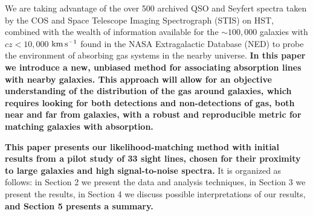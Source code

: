 \documentclass[twocolumn,tighten]{aastex6}
\begin{document}
We are taking advantage of the over 500 archived QSO and Seyfert spectra taken by the COS and Space Telescope Imaging Spectrograph (STIS) on HST, combined with the wealth of information available for the $\sim100,000$ galaxies with $cz<10,000$ $\rm km\, s^{-1}$ found in the NASA Extragalactic Database (NED) to probe the environment of absorbing gas systems in the nearby universe. \textbf{In this paper we introduce a new, unbiased method for associating absorption lines with nearby galaxies. This approach will allow for an objective understanding of the distribution of the gas around galaxies, which requires looking for both detections and non-detections of gas, both near and far from galaxies, with a robust and reproducible metric for matching galaxies with absorption.} 

\textbf{This paper presents our likelihood-matching method with initial results from a pilot study of 33 sight lines, chosen for their proximity to large galaxies and high signal-to-noise spectra.} It is organized as follows: in Section 2 we present the data and analysis techniques, in Section 3 we present the results, in Section 4 we discuss possible interpretations of our results, \textbf{and Section 5 presents a summary.}
\end{document}
